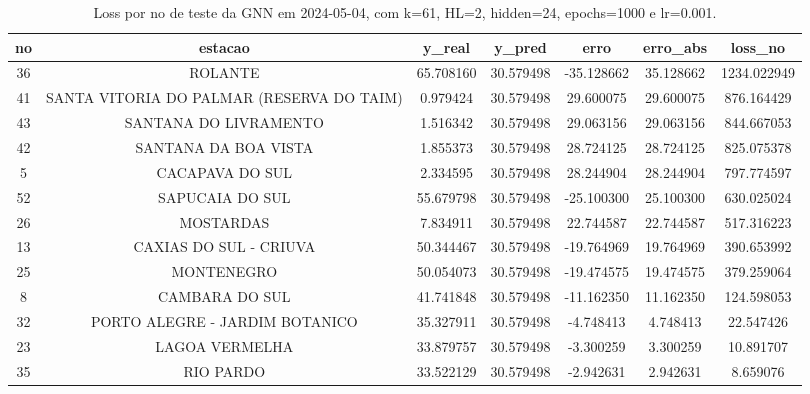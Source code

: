 \begin{table}[h]
\centering
\caption{Loss por no de teste da GNN em 2024-05-04, com k=61, HL=2, hidden=24, epochs=1000 e lr=0.001.}
\label{tab:gnn_loss_k61_hl2_h24_e1000_d20240504}
\begin{tabular}{ccccccc}
\toprule
no & estacao & y\_real & y\_pred & erro & erro\_abs & loss\_no \\
\midrule
36 & ROLANTE & 65.708160 & 30.579498 & -35.128662 & 35.128662 & 1234.022949 \\
41 & SANTA VITORIA DO PALMAR (RESERVA DO TAIM) & 0.979424 & 30.579498 & 29.600075 & 29.600075 & 876.164429 \\
43 & SANTANA DO LIVRAMENTO & 1.516342 & 30.579498 & 29.063156 & 29.063156 & 844.667053 \\
42 & SANTANA DA BOA VISTA & 1.855373 & 30.579498 & 28.724125 & 28.724125 & 825.075378 \\
5 & CACAPAVA DO SUL & 2.334595 & 30.579498 & 28.244904 & 28.244904 & 797.774597 \\
52 & SAPUCAIA DO SUL & 55.679798 & 30.579498 & -25.100300 & 25.100300 & 630.025024 \\
26 & MOSTARDAS & 7.834911 & 30.579498 & 22.744587 & 22.744587 & 517.316223 \\
13 & CAXIAS DO SUL - CRIUVA & 50.344467 & 30.579498 & -19.764969 & 19.764969 & 390.653992 \\
25 & MONTENEGRO & 50.054073 & 30.579498 & -19.474575 & 19.474575 & 379.259064 \\
8 & CAMBARA DO SUL & 41.741848 & 30.579498 & -11.162350 & 11.162350 & 124.598053 \\
32 & PORTO ALEGRE - JARDIM BOTANICO & 35.327911 & 30.579498 & -4.748413 & 4.748413 & 22.547426 \\
23 & LAGOA VERMELHA & 33.879757 & 30.579498 & -3.300259 & 3.300259 & 10.891707 \\
35 & RIO PARDO & 33.522129 & 30.579498 & -2.942631 & 2.942631 & 8.659076 \\
\bottomrule
\end{tabular}
\end{table}

